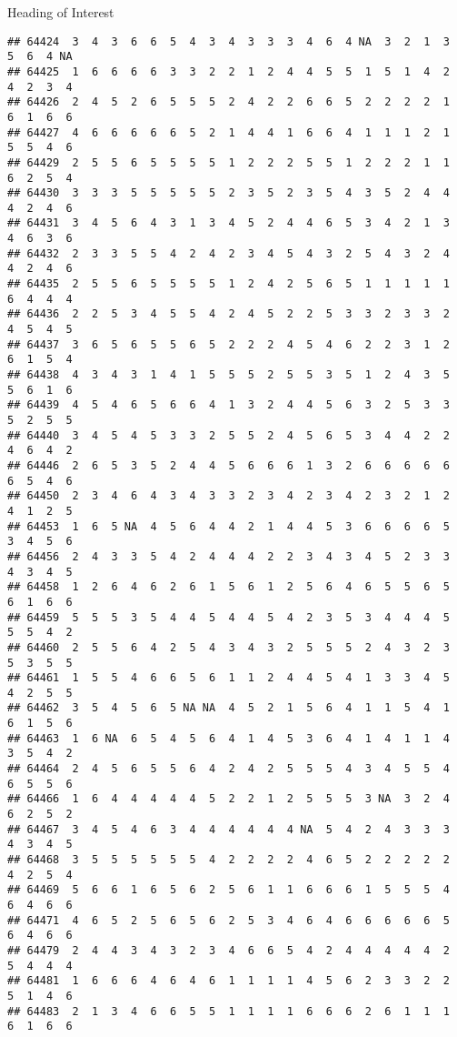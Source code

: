 \documentclass[
  ignorenonframetext,
]{beamer}
\begin{document}
\begin{frame}[fragile]{Heading of Interest}
\begin{verbatim}
## 64424  3  4  3  6  6  5  4  3  4  3  3  3  4  6  4 NA  3  2  1  3  5  6  4 NA
## 64425  1  6  6  6  6  3  3  2  2  1  2  4  4  5  5  1  5  1  4  2  4  2  3  4
## 64426  2  4  5  2  6  5  5  5  2  4  2  2  6  6  5  2  2  2  2  1  6  1  6  6
## 64427  4  6  6  6  6  6  5  2  1  4  4  1  6  6  4  1  1  1  2  1  5  5  4  6
## 64429  2  5  5  6  5  5  5  5  1  2  2  2  5  5  1  2  2  2  1  1  6  2  5  4
## 64430  3  3  3  5  5  5  5  5  2  3  5  2  3  5  4  3  5  2  4  4  4  2  4  6
## 64431  3  4  5  6  4  3  1  3  4  5  2  4  4  6  5  3  4  2  1  3  4  6  3  6
## 64432  2  3  3  5  5  4  2  4  2  3  4  5  4  3  2  5  4  3  2  4  4  2  4  6
## 64435  2  5  5  6  5  5  5  5  1  2  4  2  5  6  5  1  1  1  1  1  6  4  4  4
## 64436  2  2  5  3  4  5  5  4  2  4  5  2  2  5  3  3  2  3  3  2  4  5  4  5
## 64437  3  6  5  6  5  5  6  5  2  2  2  4  5  4  6  2  2  3  1  2  6  1  5  4
## 64438  4  3  4  3  1  4  1  5  5  5  2  5  5  3  5  1  2  4  3  5  5  6  1  6
## 64439  4  5  4  6  5  6  6  4  1  3  2  4  4  5  6  3  2  5  3  3  5  2  5  5
## 64440  3  4  5  4  5  3  3  2  5  5  2  4  5  6  5  3  4  4  2  2  4  6  4  2
## 64446  2  6  5  3  5  2  4  4  5  6  6  6  1  3  2  6  6  6  6  6  6  5  4  6
## 64450  2  3  4  6  4  3  4  3  3  2  3  4  2  3  4  2  3  2  1  2  4  1  2  5
## 64453  1  6  5 NA  4  5  6  4  4  2  1  4  4  5  3  6  6  6  6  5  3  4  5  6
## 64456  2  4  3  3  5  4  2  4  4  4  2  2  3  4  3  4  5  2  3  3  4  3  4  5
## 64458  1  2  6  4  6  2  6  1  5  6  1  2  5  6  4  6  5  5  6  5  6  1  6  6
## 64459  5  5  5  3  5  4  4  5  4  4  5  4  2  3  5  3  4  4  4  5  5  5  4  2
## 64460  2  5  5  6  4  2  5  4  3  4  3  2  5  5  5  2  4  3  2  3  5  3  5  5
## 64461  1  5  5  4  6  6  5  6  1  1  2  4  4  5  4  1  3  3  4  5  4  2  5  5
## 64462  3  5  4  5  6  5 NA NA  4  5  2  1  5  6  4  1  1  5  4  1  6  1  5  6
## 64463  1  6 NA  6  5  4  5  6  4  1  4  5  3  6  4  1  4  1  1  4  3  5  4  2
## 64464  2  4  5  6  5  5  6  4  2  4  2  5  5  5  4  3  4  5  5  4  6  5  5  6
## 64466  1  6  4  4  4  4  4  5  2  2  1  2  5  5  5  3 NA  3  2  4  6  2  5  2
## 64467  3  4  5  4  6  3  4  4  4  4  4  4 NA  5  4  2  4  3  3  3  4  3  4  5
## 64468  3  5  5  5  5  5  5  4  2  2  2  2  4  6  5  2  2  2  2  2  4  2  5  4
## 64469  5  6  6  1  6  5  6  2  5  6  1  1  6  6  6  1  5  5  5  4  6  4  6  6
## 64471  4  6  5  2  5  6  5  6  2  5  3  4  6  4  6  6  6  6  6  5  6  4  6  6
## 64479  2  4  4  3  4  3  2  3  4  6  6  5  4  2  4  4  4  4  4  2  5  4  4  4
## 64481  1  6  6  6  4  6  4  6  1  1  1  1  4  5  6  2  3  3  2  2  5  1  4  6
## 64483  2  1  3  4  6  6  5  5  1  1  1  1  6  6  6  2  6  1  1  1  6  1  6  6

\end{verbatim}
\end{frame}
\end{document}
